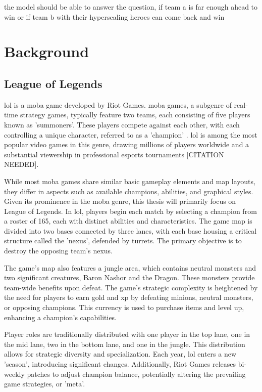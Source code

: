 \documentclass[12pt, a4paper, headinclude, twoside, plainheadsepline, open=right, numbers=noenddot, hidelinks, toc=listof, toc=bibliography]{scrreprt}
\begin{document}
the model should be able to answer the question, if team a is far enough ahead to win or if team b with their hyperscaling heroes can come back and win

\chapter{Background}
\label{chap:background}

\section{League of Legends}
\label{sec:LoL}

\ac{lol} is a \ac{moba} game developed by Riot Games. 
\Ac{moba} games, a subgenre of real-time strategy games, typically feature two teams, each consisting of five players known as 'summoners'. 
These players compete against each other, with each controlling a unique character, referred to as a 'champion' \cite{mora-cantallopsMOBAGamesLiterature2018}. 
\ac{lol} is among the most popular video games in this genre, drawing millions of players worldwide and a substantial viewership in professional esports tournaments [CITATION NEEDED].

While most \ac{moba} games share similar basic gameplay elements and map layouts, they differ in aspects such as available champions, abilities, and graphical styles. 
Given its prominence in the \ac{moba} genre, this thesis will primarily focus on League of Legends. 
In \ac{lol}, players begin each match by selecting a champion from a roster of 165, each with distinct abilities and characteristics. 
The game map is divided into two bases connected by three lanes, with each base housing a critical structure called the 'nexus', defended by turrets. 
The primary objective is to destroy the opposing team's nexus.

The game's map also features a jungle area, which contains neutral monsters and two significant creatures, Baron Nashor and the Dragon. 
These monsters provide team-wide benefits upon defeat. The game's strategic complexity is heightened by the need for players to earn gold and \ac{xp} by defeating minions, neutral monsters, or opposing champions. 
This currency is used to purchase items and level up, enhancing a champion's capabilities.

Player roles are traditionally distributed with one player in the top lane, one in the mid lane, two in the bottom lane, and one in the jungle. This distribution allows for strategic diversity and specialization. 
Each year, \ac{lol} enters a new 'season', introducing significant changes. Additionally, Riot Games releases bi-weekly patches to adjust champion balance, potentially altering the prevailing game strategies, or 'meta'.
\end{document}
